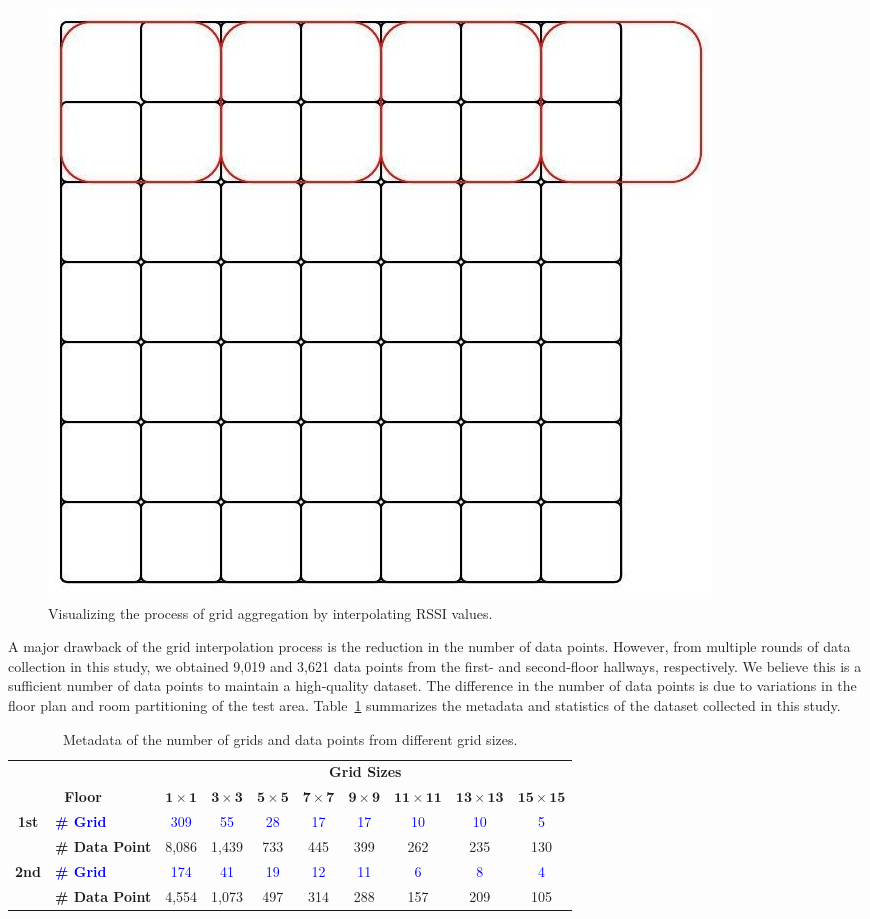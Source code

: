 \documentclass[runningheads]{llncs}
\begin{document}
\begin{figure}[th!]
        \centering
        \includegraphics[width=.3\linewidth]{figures/image14.jpg}
        \caption{Visualizing the process of grid aggregation by interpolating RSSI values.}
        \label{fig:vis-grid-aggr}
\end{figure}

A major drawback of the grid interpolation process is the reduction in the number of data points. However, from multiple rounds of data collection in this study, we obtained 9,019 and 3,621 data points from the first- and second-floor hallways, respectively. We believe this is a sufficient number of data points to maintain a high-quality dataset. The difference in the number of data points is due to variations in the floor plan and room partitioning of the test area. Table~\ref{tab:metadata} summarizes the metadata and statistics of the dataset collected in this study.

\begin{table}[th!]
        \caption{Metadata of the number of grids and data points from different grid sizes.}
        \label{tab:metadata}
        \centering
        \begin{tabular}{|c|l|c|c|c|c|c|c|c|c|}
                \hline
                \multicolumn{2}{|c|}{} & \multicolumn{8}{|c|}{\textbf{Grid Sizes}} \\
                \cline{3-10}
                \multicolumn{2}{|c|}{\textbf{Floor}} & $\mathbf{1\times1}$ & $\mathbf{3\times3}$ & $\mathbf{5\times5}$ & $\mathbf{7\times7}$ & $\mathbf{9\times9}$ & $\mathbf{11\times11}$ & $\mathbf{13\times13}$ & $\mathbf{15\times15}$ \\
                \hline
                \textbf{1st} & \textcolor{blue}{\textbf{\# Grid}} & \textcolor{blue}{309} & \textcolor{blue}{55} & \textcolor{blue}{28} & \textcolor{blue}{17} & \textcolor{blue}{17} & \textcolor{blue}{10} & \textcolor{blue}{10} & \textcolor{blue}{5} \\
                \cline{2-10}
                & \textbf{\# Data Point} & 8,086 & 1,439 & 733 & 445 & 399 & 262 & 235 & 130 \\
                \hline
                \textbf{2nd} & \textcolor{blue}{\textbf{\# Grid}} & \textcolor{blue}{174} & \textcolor{blue}{41} & \textcolor{blue}{19} & \textcolor{blue}{12} & \textcolor{blue}{11} & \textcolor{blue}{6} & \textcolor{blue}{8} & \textcolor{blue}{4} \\
                \cline{2-10}
                & \textbf{\# Data Point} & 4,554 & 1,073 & 497 & 314 & 288 & 157 & 209 & 105 \\
                \hline    
        \end{tabular}
\end{table}
\end{document}
